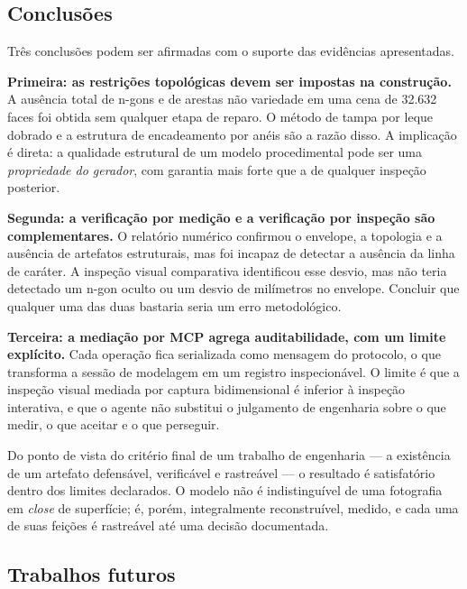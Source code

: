 \subsection{Conclus\~oes}

Tr\^es conclus\~oes podem ser afirmadas com o suporte das evid\^encias apresentadas.

\textbf{Primeira: as restri\c{c}\~oes topol\'ogicas devem ser impostas na
constru\c{c}\~ao.} A aus\^encia total de n-gons e de arestas n\~ao variedade em uma cena de
32.632 faces foi obtida sem qualquer etapa de reparo. O m\'etodo de tampa por leque
dobrado e a estrutura de encadeamento por an\'eis s\~ao a raz\~ao disso. A
implica\c{c}\~ao \'e direta: a qualidade estrutural de um modelo procedimental pode ser uma
\emph{propriedade do gerador}, com garantia mais forte que a de qualquer
inspe\c{c}\~ao posterior.

\textbf{Segunda: a verifica\c{c}\~ao por medi\c{c}\~ao e a verifica\c{c}\~ao por
inspe\c{c}\~ao s\~ao complementares.} O relat\'orio num\'erico confirmou o envelope, a
topologia e a aus\^encia de artefatos estruturais, mas foi incapaz de detectar a
aus\^encia da linha de car\'ater. A inspe\c{c}\~ao visual comparativa identificou esse
desvio, mas n\~ao teria detectado um n-gon oculto ou um desvio de mil\'imetros no envelope.
Concluir que qualquer uma das duas bastaria seria um erro metodol\'ogico.

\textbf{Terceira: a media\c{c}\~ao por MCP agrega auditabilidade, com um limite
expl\'icito.} Cada opera\c{c}\~ao fica serializada como mensagem do protocolo, o que
transforma a sess\~ao de modelagem em um registro inspecion\'avel. O limite \'e que a
inspe\c{c}\~ao visual mediada por captura bidimensional \'e inferior \`a
inspe\c{c}\~ao interativa, e que o agente n\~ao substitui o julgamento de engenharia sobre
o que medir, o que aceitar e o que perseguir.

Do ponto de vista do crit\'erio final de um trabalho de engenharia --- a exist\^encia de um
artefato defens\'avel, verific\'avel e rastre\'avel --- o resultado \'e satisfat\'orio
dentro dos limites declarados. O modelo n\~ao \'e indistingu\'ivel de uma fotografia em
\emph{close} de superf\'icie; \'e, por\'em, integralmente reconstru\'ivel, medido, e cada
uma de suas fei\c{c}\~oes \'e rastre\'avel at\'e uma decis\~ao documentada.

\subsection{Trabalhos futuros}

